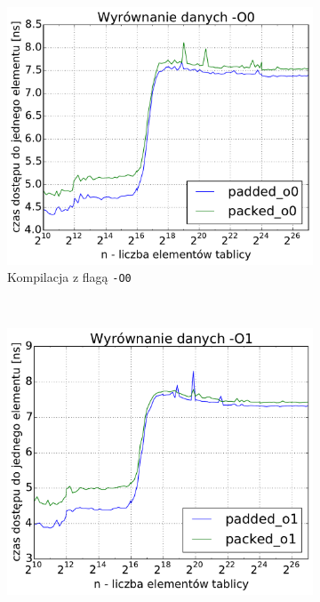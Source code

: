 \begin{figure}[!h]
    \centering
    \begin{subfigure}[c]{0.45\textwidth}
        \centering
        \includegraphics[width=\textwidth]{images/benchs_xeon/data_alignment_O0}
        \caption{Kompilacja z flagą \texttt{-O0}}
    \end{subfigure}
    ~
    \begin{subfigure}[c]{0.45\textwidth}
        \centering
        \includegraphics[width=\textwidth]{images/benchs_xeon/data_alignment_O1}

\end{subfigure}
\end{figure}
